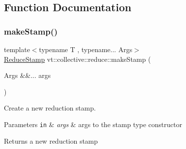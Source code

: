 \subsection{Function Documentation}
\mbox{\label{namespacevt_1_1collective_1_1reduce_a16bd926f0a7f318a75d2bf921b516db3}} 
\subsubsection{\texorpdfstring{make\+Stamp()}{makeStamp()}}
{\footnotesize\ttfamily template$<$typename T , typename... Args$>$ \\
\hyperlink{namespacevt_1_1collective_1_1reduce_a7b7cb3021ac5654d92825d9fab0250b2}{Reduce\+Stamp} vt\+::collective\+::reduce\+::make\+Stamp (\begin{DoxyParamCaption}\item[{Args \&\&...}]{args }\end{DoxyParamCaption})}



Create a new reduction stamp. 


\begin{DoxyParams}[1]{Parameters}
\mbox{\tt in}  & {\em args} & args to the stamp type constructor\\
\hline
\end{DoxyParams}
\begin{DoxyReturn}{Returns}
a new reduction stamp 
\end{DoxyReturn}
